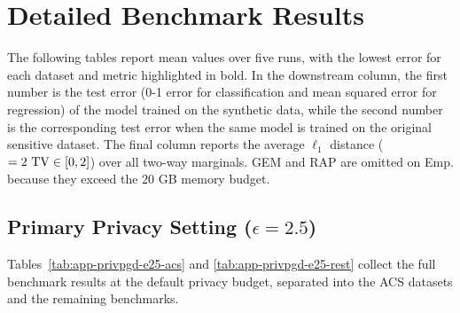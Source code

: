 \FloatBarrier

\clearpage
\section{Detailed Benchmark Results}
\label{app:privpgd-tables}

The following tables report mean values over five runs, with the lowest error for each dataset and metric highlighted in bold. In the downstream column, the first number is the test error (0-1 error for classification and mean squared error for regression) of the model trained on the synthetic data, while the second number is the corresponding test error when the same model is trained on the original sensitive dataset. The final column reports the average \(\ell_1\) distance (\(= 2\,\operatorname{TV} \in [0,2]\)) over all two-way marginals. GEM and RAP are omitted on Emp. because they exceed the \(20\) GB memory budget.

\subsection{Primary Privacy Setting (\texorpdfstring{$\epsilon = 2.5$}{epsilon = 2.5})}

Tables~\ref{tab:app-privpgd-e25-acs} and \ref{tab:app-privpgd-e25-rest} collect the full benchmark results at the default privacy budget, separated into the ACS datasets and the remaining benchmarks.

